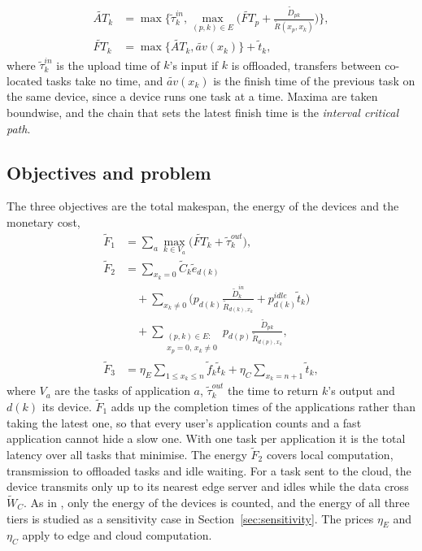 \begin{align}
\widetilde{AT}_k &= \max\Big\{\tilde\tau^{in}_k, \max_{(p, k) \in E} \Big(\widetilde{FT}_p + \frac{\tilde D_{pk}}{\tilde R(x_p, x_k)}\Big)\Big\}, \label{eq:at}\\
\widetilde{FT}_k &= \max\{\widetilde{AT}_k, \widetilde{av}(x_k)\} + \tilde t_k, \label{eq:ft}
\end{align}
where $\tilde\tau^{in}_k$ is the upload time of $k$'s input if $k$ is offloaded, transfers between co-located tasks
take no time, and $\widetilde{av}(x_k)$ is the finish time of the previous task on the same device, since a device runs
one task at a time. Maxima are taken boundwise, and the chain that sets the latest finish time is the \emph{interval
critical path}.

\subsection{Objectives and problem}
The three objectives are the total makespan, the energy of the devices and the monetary cost,
\begin{align}
\tilde F_1 &= \sum_{a} \max_{k \in V_a} \big(\widetilde{FT}_k + \tilde\tau^{out}_k\big), \label{eq:f1}\\
\tilde F_2 &= \sum_{x_k = 0} \tilde C_k \tilde e_{d(k)} \nonumber\\
  &\quad + \sum_{x_k \ne 0} \Big(p_{d(k)} \frac{\tilde D^{in}_k}{\tilde R_{d(k), x_k}} + p^{idle}_{d(k)} \tilde t_k\Big) \nonumber\\
  &\quad + \sum_{\substack{(p, k) \in E:\\ x_p = 0,\, x_k \ne 0}} p_{d(p)} \frac{\tilde D_{pk}}{\tilde R_{d(p), x_k}}, \label{eq:f2}\\
\tilde F_3 &= \eta_E \sum_{1 \le x_k \le n} \tilde f_k \tilde t_k + \eta_C \sum_{x_k = n+1} \tilde t_k, \label{eq:f3}
\end{align}
where $V_a$ are the tasks of application $a$, $\tilde\tau^{out}_k$ the time to return $k$'s output and $d(k)$ its
device. $\tilde F_1$ adds up the completion times of the applications rather than taking the latest one, so that every
user's application counts and a fast application cannot hide a slow one. With one task per application it is the
total latency over all tasks that \citet{jin2026imoeadqn} minimise. The energy $\tilde F_2$ covers local computation, transmission to offloaded tasks and idle waiting. For a task
sent to the cloud, the device transmits only up to its nearest edge server and idles while the data cross
$\tilde W_C$. As in \citet{jin2026imoeadqn}, only the energy of the devices is counted, and the energy of all three tiers
is studied as a sensitivity case in Section~\ref{sec:sensitivity}. The prices $\eta_E$ and $\eta_C$ apply to edge and
cloud computation.

